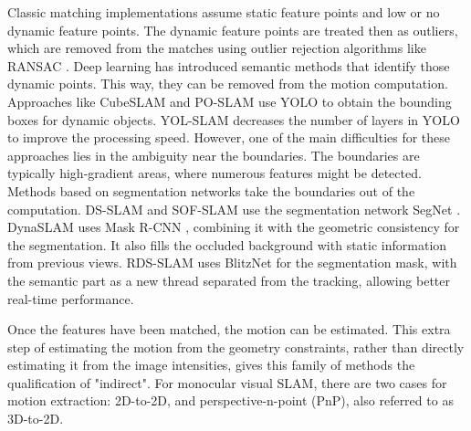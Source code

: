 Classic matching implementations assume static feature points and low or no dynamic feature points. The dynamic feature points are treated then as outliers, which are removed from the matches using outlier rejection algorithms like \ac{RANSAC} \cite{fischler1981RANSACpnp}. Deep learning has introduced semantic methods that identify those dynamic points. This way, they can be removed from the motion computation. Approaches like CubeSLAM \cite{yang2019cubeslam} and PO-SLAM \cite{li2021po-slam} use YOLO \cite{redmon2017yolo9000} to obtain the bounding boxes for dynamic objects. YOL-SLAM \cite{mengcong2021yol-slam} decreases the number of layers in YOLO to improve the processing speed. However, one of the main difficulties for these approaches lies in the ambiguity near the boundaries. The boundaries are typically high-gradient areas, where numerous features might be detected. Methods based on segmentation networks take the boundaries out of the computation.
DS-SLAM\cite{yu2018ds-slam} and SOF-SLAM\cite{cui2019sof-slam} use the segmentation network SegNet \cite{badrinarayanan2017segnet}. DynaSLAM\cite{dynaslam18} uses Mask R-CNN \cite{he2017maskRCNN}, combining it with the geometric consistency for the segmentation. It also fills the occluded background with static information from previous views. RDS-SLAM \cite{liu2021rds-slam} uses BlitzNet \cite{dvornik2017blitznet} for the segmentation mask, with the semantic part as a new thread separated from the tracking, allowing better real-time performance.

Once the features have been matched, the motion can be estimated. This extra step of estimating the motion from the geometry constraints, rather than directly estimating it from the image intensities, gives this family of methods the qualification of "indirect".
 For monocular visual SLAM, there are two cases for motion extraction: 2D-to-2D, and perspective-n-point (PnP), also referred to as 3D-to-2D.
 
